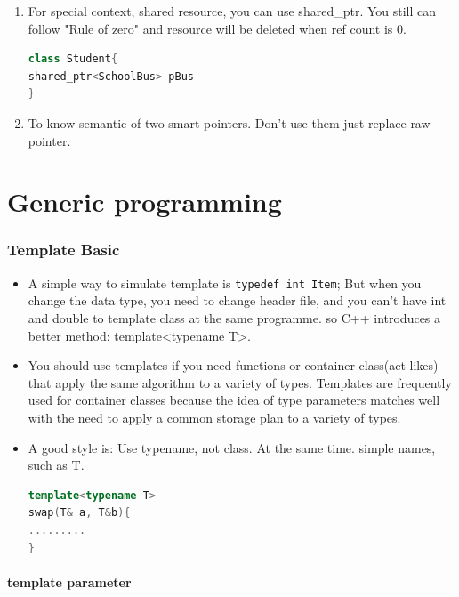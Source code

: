 \documentclass[a4paper,12pt,twoside]{book}
\begin{document}
\begin{itemize}
\begin{enumerate}
\item For special context, shared resource, you can use shared\_ptr.  You still can follow "Rule of zero" and resource will be deleted when ref count is 0.
\begin{lstlisting}[frame=single, language=c++]
class Student{
shared_ptr<SchoolBus> pBus
}
\end{lstlisting}

\item To know semantic of two smart pointers. Don't use them just replace raw pointer.
\end{enumerate}

\end{itemize}

\chapter{Generic programming}


\subsection{Template Basic}
\begin{itemize}
\item A simple way to simulate template is \verb=typedef int Item=; But when you change the data type, you need to change header file, and you can't have int and double to template class at the same programme. so C++ introduces a better method: template<typename T>.

\item You should use templates if you need functions or container class(act likes) that apply the same algorithm to a variety of types. Templates are frequently used for container classes because the idea of type parameters matches well with the need to apply a common storage plan to a variety of types.

\item A good style is: Use typename, not class. At the same time. simple names, such as T.
\begin{lstlisting}[frame=single, language=c++]
template<typename T> 
swap(T& a, T&b){
.........
}
\end{lstlisting}

\end{itemize}

\subsubsection{template parameter}
\end{document}
